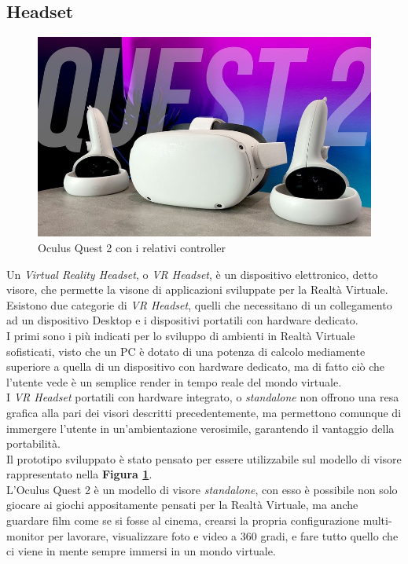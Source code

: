 \subsection{Headset}
\begin{figure}[H]
    \centering
    \includegraphics[scale = 0.5]{Immagini/Oculus-Quest-2.jpg}
    \caption{Oculus Quest 2 con i relativi controller}
    \label{fig:Figura 3.1}
\end{figure}
Un \textit{Virtual Reality Headset}\cite{Vrheadset}, o \textit{VR Headset}, è un dispositivo elettronico, detto visore, che permette la visone di applicazioni sviluppate per la Realtà Virtuale.\\Esistono due categorie di \textit{VR Headset}, quelli che necessitano di un collegamento ad un dispositivo Desktop e i dispositivi portatili con hardware dedicato.\\I primi sono i più indicati per lo sviluppo di ambienti in Realtà Virtuale sofisticati, visto che un PC è dotato di una potenza di calcolo mediamente superiore a quella di un dispositivo con hardware dedicato, ma di fatto ciò che l'utente vede è un semplice \gls{render} in tempo reale del mondo virtuale.\\I \textit{VR Headset} portatili con hardware integrato, o \textit{standalone} non offrono una resa grafica alla pari dei visori descritti precedentemente, ma permettono comunque di immergere l'utente in un'ambientazione verosimile, garantendo il vantaggio della portabilità.
\\Il prototipo sviluppato è stato pensato per essere utilizzabile sul modello di visore rappresentato nella \textbf{Figura \ref{fig:Figura 3.1}}.
\\L'Oculus Quest 2 è un modello di visore \textit{standalone}, con esso è possibile non solo giocare ai giochi appositamente pensati per la Realtà Virtuale, ma anche guardare film come se si fosse al cinema, crearsi la propria configurazione multi-monitor per lavorare, visualizzare foto e video a 360 gradi, e fare tutto quello che ci viene in mente sempre immersi in un mondo virtuale.
